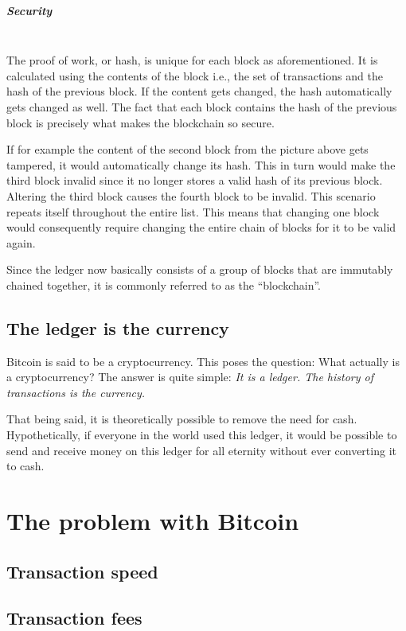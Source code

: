 \documentclass[a4paper, 12pt]{report}
\begin{document}
\paragraph{Security} \hspace{0pt} \\
The proof of work, or hash, is unique for each block as aforementioned. It is calculated using the contents of the block i.e., the set of transactions and the hash of the previous block. If the content gets changed, the hash automatically gets changed as well. The fact that each block contains the hash of the previous block is precisely what makes the blockchain so secure. 
\par If for example the content of the second block from the picture above gets tampered, it would automatically change its hash. This in turn would make the third block invalid since it no longer stores a valid hash of its previous block. Altering the third block causes the fourth block to be invalid. This scenario repeats itself throughout the entire list. This means that changing one block would consequently require changing the entire chain of blocks for it to be valid again. 
\par Since the ledger now basically consists of a group of blocks that are immutably chained together, it is commonly referred to as the “blockchain”. 

\section{The ledger is the currency}
\par Bitcoin is said to be a cryptocurrency. This poses the question: What actually is a cryptocurrency? The answer is quite simple: \textit{It is a ledger. The history of transactions is the currency.}
\par That being said, it is theoretically possible to remove the need for cash. Hypothetically, if everyone in the world used this ledger, it would be possible to send and receive money on this ledger for all eternity without ever converting it to cash.

\chapter{The problem with Bitcoin}
\section{Transaction speed}
\section{Transaction fees}
\end{document}
